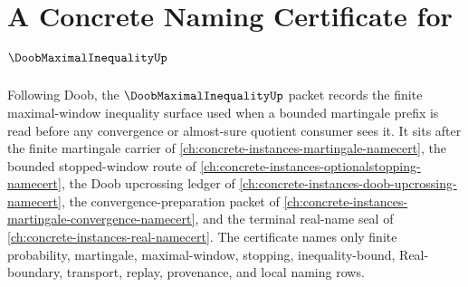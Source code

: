 \chapter{A Concrete Naming Certificate for $\DoobMaximalInequalityUp$}
\label{ch:concrete-instances-doob-maximal-inequality-namecert}

Following Doob, the $\DoobMaximalInequalityUp$ packet records the finite maximal-window inequality surface used when a bounded martingale prefix is read before any convergence or almost-sure quotient consumer sees it. It sits after the finite martingale carrier of \autoref{ch:concrete-instances-martingale-namecert}, the bounded stopped-window route of \autoref{ch:concrete-instances-optionalstopping-namecert}, the Doob upcrossing ledger of \autoref{ch:concrete-instances-doob-upcrossing-namecert}, the convergence-preparation packet of \autoref{ch:concrete-instances-martingale-convergence-namecert}, and the terminal real-name seal of \autoref{ch:concrete-instances-real-namecert}. The certificate names only finite probability, martingale, maximal-window, stopping, inequality-bound, Real-boundary, transport, replay, provenance, and local naming rows.


